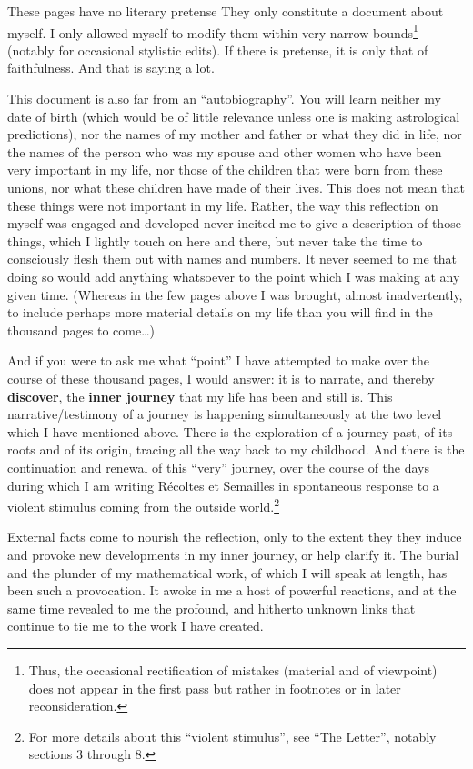 These pages have no literary pretense 
They only constitute a document about myself. I only allowed myself to modify them within 
very narrow bounds\footnote{Thus, the occasional rectification of mistakes (material
and of viewpoint) does not appear in the first pass but rather in 
footnotes or in later reconsideration.} (notably for occasional stylistic edits). If there
is pretense, it is only that of faithfulness. And that is saying a lot. 

This document is also far from an ``autobiography''. 
You will learn neither my date of birth (which would be of little relevance unless one is
making astrological predictions), nor the names of my mother and father 
or what they did in life, nor the names of the person who was my spouse and other women
who have been very important in my life, nor those of the children that were born from
these unions, nor what these children have made of their lives.
This does not mean that these things were not important in my life. Rather, the way this
reflection on myself was engaged and developed never incited me to give a description of
those things, which I lightly touch on here and there, but never take the time to
consciously flesh them out with names and numbers. It never seemed to me that doing so
would add anything whatsoever to the point which I was making at any given time. (Whereas
in the few pages above I was brought, almost inadvertently, 
to include perhaps more material details on my life than
you will find in the thousand pages to come\ldots)

And if you were to ask me what ``point'' I have attempted to make over the course of
these thousand pages, I would answer: it is to narrate, and thereby \textbf{discover}, 
the \textbf{inner journey} that my life has been and still is. 
This narrative/testimony of a journey
is happening simultaneously at the two level which I have mentioned above. There is the
exploration of a journey past, of its roots and of its origin, tracing all the way back to
my childhood. And there is the continuation and renewal of this ``very'' journey, over the
course of the days during which I am writing  R\'ecoltes et Semailles
in spontaneous response to a violent stimulus coming from the outside
world.\footnote{For more details about this ``violent stimulus'', see ``The Letter'',
notably sections 3 through 8.
} 

External facts come to nourish the reflection, only to the extent they they induce and
provoke new
developments in my inner journey, or help clarify it. 
The burial and the plunder of my mathematical work, of which I will speak at length, has
been such a provocation. It awoke in me
a host of powerful reactions, and at the same time revealed to me the profound, and
hitherto unknown links that continue to tie me to the work I have created.

